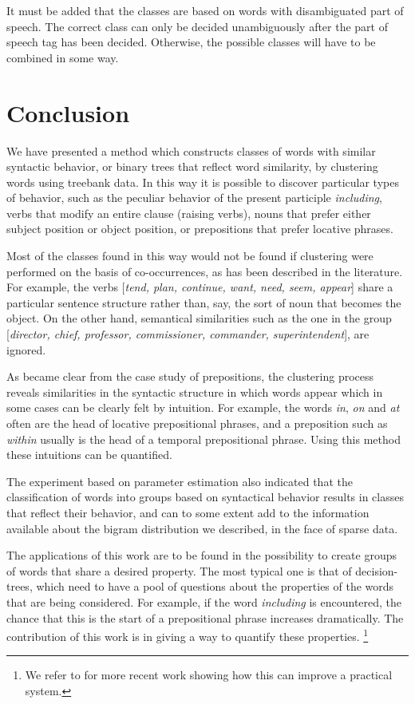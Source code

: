 It must be added that the classes are based on words with disambiguated
part of speech. The correct class can only be decided unambiguously after the
part of speech tag has been decided. Otherwise, the possible classes will have
to be combined in some way.

\section{Conclusion}

We have presented a method which constructs classes of words with
similar syntactic behavior, or binary trees that reflect word
similarity, by clustering words using treebank data. In this way it is
possible to discover particular types of behavior, such as the
peculiar behavior of the present participle {\em including}, verbs
that modify an entire clause (raising verbs), nouns that prefer either
subject position or object position, or prepositions that prefer
locative phrases.

Most of the classes found in this way would not be found if clustering were
performed on the basis of co-occurrences, as has been described in the
literature. For example, the verbs [{\em tend, plan, continue, want, need, seem,
  appear}] share a particular sentence structure rather than, say, the sort of
noun that becomes the object. On the other hand, semantical similarities such as
the one in the group [{\em director, chief, professor, commissioner, commander,
  superintendent}], are ignored.

As became clear from the case study of prepositions, the clustering process
reveals similarities in the syntactic structure in which words appear which in
some cases can be clearly felt by intuition. For example, the words {\em in},
{\em on} and {\em at} often are the head of locative prepositional phrases, and
a preposition such as {\em within} usually is the head of a temporal
prepositional phrase. Using this method these intuitions can be quantified.

The experiment based on parameter estimation also indicated that the
classification of words into groups based on syntactical behavior results in
classes that reflect their behavior, and can to some extent add to the
information available about the bigram distribution we described, in the face of
sparse data.

The applications of this work are to be found in the possibility to
create groups of words that share a desired property. The most typical
one is that of decision-trees, which need to have a pool of questions
about the properties of the words that are being considered. For
example, if the word {\em including} is encountered, the chance that
this is the start of a prepositional phrase increases
dramatically. The contribution of this work is in giving a way to
quantify these properties. \footnote{We refer to \cite{ik:phd}
for more recent work showing how this can improve a practical system.}



